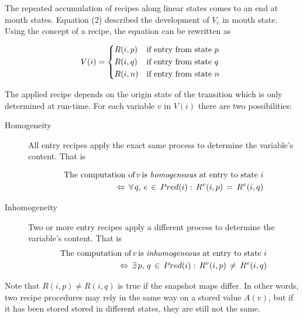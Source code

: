 \documentclass[12pt,a4paper]{scrartcl}
\begin{document}
The repeated accumulation of recipes along linear states comes to an end at
mouth states.  Equation (2) described the development of $V_c$ in mouth
state. Using the concept of a recipe, the equation can be rewritten as

\begin{eqnarray}
    V(i)  =  \begin{dcases*}
               R(i,p) &  if entry from state $p$ \\
               R(i,q) &  if entry from state $q$ \\
               R(i,n) &  if entry from state $n$
            \end{dcases*}
\end{eqnarray}

The applied recipe depends on the origin state of the transition which is only
determined at run-time.  For each variable $v$ in $V(i)$ there are two
possibilities:

\begin{description}
    \item[Homogeneity] All entry recipes apply the exact same process to
                       determine the variable's content. That is

    \begin{equation}
        \begin{aligned}
        \mbox{The computation of}\,v\,\mbox{is \textit{homogeneous} at entry to state $i$}\\
        \Leftrightarrow\,\forall\,q,\,e\,\in\,Pred(i):\,R^v(i,p)\,=\,R^v(i,q) 
        \end{aligned}
    \end{equation}

    \item[Inhomogeneity] Two or more entry recipes apply a different process
                         to determine the variable's content. That is
    \begin{equation}
        \begin{aligned}
        \mbox{The computation of}\,v\,\mbox{is \textit{inhomogeneous} at entry to state $i$}\\
        \Leftrightarrow\,\exists\,p,\,q\,\in\,Pred(i):\,R^v(i,p)\,\neq\,R^v(i,q)
        \end{aligned}
    \end{equation}
\end{description}

Note that $R(i,p) \neq R(i,q)$ is true if the snapshot maps differ. In other
words, two recipe procedures may rely in the same way on a stored value $A(v)$,
but if it has been stored stored in different states, they are still not
the same.
\end{document}
